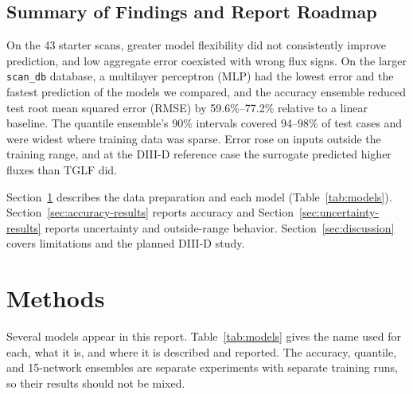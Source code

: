 \documentclass[12pt,letterpaper]{article}
\begin{document}
\subsection{Summary of Findings and Report Roadmap}

On the 43 starter scans, greater model flexibility did not consistently
improve prediction, and low aggregate error coexisted with wrong flux signs.
On the larger \texttt{scan\_db} database, a multilayer perceptron (MLP) had the lowest error and the
fastest prediction of the models we compared, and the accuracy ensemble
reduced test root mean squared error (RMSE) by 59.6\%--77.2\% relative to a linear
baseline. The quantile ensemble's 90\% intervals covered 94--98\% of test
cases and were widest where training data was sparse. Error rose on inputs
outside the training range, and at the DIII-D reference case the surrogate
predicted higher fluxes than TGLF did.

Section~\ref{sec:methods} describes the data preparation and each model
(Table~\ref{tab:models}). Section~\ref{sec:accuracy-results} reports accuracy
and Section~\ref{sec:uncertainty-results} reports uncertainty and
outside-range behavior. Section~\ref{sec:discussion} covers limitations and the
planned DIII-D study.

\section{Methods}
\label{sec:methods}

Several models appear in this report. Table~\ref{tab:models} gives the name
used for each, what it is, and where it is described and reported. The
accuracy, quantile, and 15-network ensembles are separate experiments with
separate training runs, so their results should not be mixed.
\end{document}
